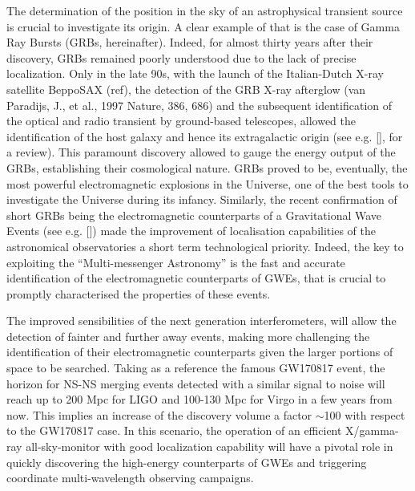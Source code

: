 \documentclass[]{spie}  %
\begin{document}
The determination of the position in the sky of an astrophysical transient source is crucial to investigate its origin. A clear example of that is the case of Gamma Ray Bursts (GRBs, hereinafter). Indeed, for almost thirty years after their discovery, GRBs remained poorly understood due to the lack of precise localization. Only in the late 90s, with the launch of the Italian-Dutch X-ray satellite BeppoSAX (ref), the detection of the GRB X-ray afterglow (van Paradijs, J., et al., 1997 Nature, 386, 686) and the subsequent identification of the optical and radio transient by ground-based telescopes, allowed the identification of the host galaxy and hence its extragalactic origin (see e.g. [], for a review). This paramount discovery allowed to gauge the energy output of the GRBs, establishing their cosmological nature. GRBs proved to be, eventually, the most powerful electromagnetic explosions in the Universe, one of the best tools to investigate the Universe during its infancy. Similarly, the recent confirmation of short GRBs being the electromagnetic counterparts of a Gravitational Wave Events (see e.g. []) made the improvement of localisation capabilities of the astronomical observatories a short term technological priority. Indeed, the key to exploiting the “Multi-messenger Astronomy” is the fast and accurate identification of the electromagnetic counterparts of GWEs, that is crucial to promptly characterised the properties of these events. 

The improved sensibilities of the next generation interferometers, will allow the detection of fainter and further away events, making more challenging the identification of their electromagnetic counterparts given the larger portions of space to be searched. Taking as a reference the famous GW170817 event, the horizon for NS-NS merging events detected with a similar signal to noise will reach up to 200 Mpc for LIGO and 100-130 Mpc for Virgo in a few years from now. This implies an increase of the discovery volume a factor $\sim$100 with respect to the GW170817 case. In this scenario, the operation of an efficient X/gamma-ray all-sky-monitor with good localization capability will have a pivotal role in quickly discovering the high-energy counterparts of GWEs and triggering coordinate multi-wavelength observing campaigns.
\end{document}
